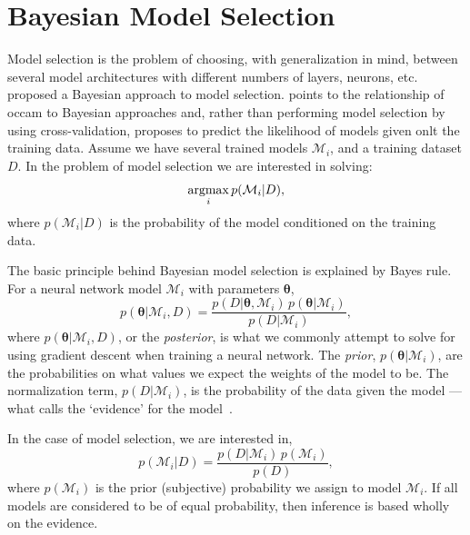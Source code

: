 \documentclass[thesis]{subfiles}
\begin{document}
\section{Bayesian Model Selection}
Model selection is the problem of choosing, with generalization in mind, between several model architectures with different numbers of layers, neurons, etc. 
\citet{mackay1992practical} proposed a Bayesian approach to model selection. \citeauthor{mackay1992practical} points to the relationship of \gls{occam} to Bayesian approaches and, rather than performing model selection by using cross-validation, \citeauthor{mackay1992practical} proposes to predict the likelihood of models given onlt the training data. Assume we have several trained models $\mathcal{M}_i$, and a training dataset $D$. In the problem of model selection we are interested in solving:
\begin{equation}
	\operatorname*{argmax}_i p(\mathcal{M}_i|D),
\end{equation}
where $p(\mathcal{M}_i|D)$ is the probability of the model conditioned on the training data.

The basic principle behind Bayesian model selection is explained by Bayes rule. For a neural network model $\mathcal{M}_i$ with parameters $\mathbf{\theta}$,
\begin{equation}
	p(\mathbf{\theta}|\mathcal{M}_i,D) = \frac{p(D|\mathbf{\theta},\mathcal{M}_i)\,p(\mathbf{\theta}|\mathcal{M}_i)}{p(D|\mathcal{M}_i)},
\end{equation}
where $p(\mathbf{\theta}|\mathcal{M}_i,D)$, or the \emph{posterior}, is what we commonly attempt to solve for using gradient descent when training a neural network.
The \emph{prior}, $p(\mathbf{\theta}|\mathcal{M}_i)$, are the probabilities on what values we expect the weights of the model to be. The normalization term, $p(D|\mathcal{M}_i)$, is the probability of the data given the model --- what \citeauthor{mackay1992practical} calls the `evidence' for the model~\citep{mackay1995}.

In the case of model selection, we are interested in,
\begin{equation}
	p(\mathcal{M}_i|D) = \frac{p(D|\mathcal{M}_i)\,p(\mathcal{M}_i)}{p(D)},
\end{equation}
where $p(\mathcal{M}_i)$ is the prior (subjective) probability we assign to model $\mathcal{M}_i$. If all models are considered to be of equal probability, then inference is based wholly on the evidence.
\end{document}
